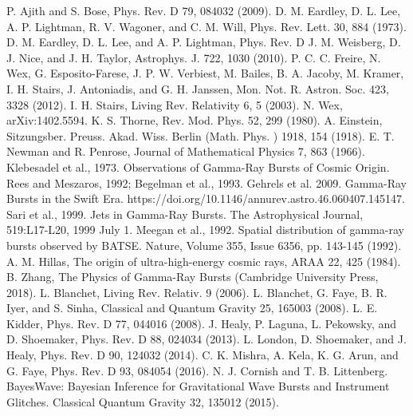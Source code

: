 \documentclass[binding=0.6cm, LaM]{sapthesis}
\begin{document}
\begin{thebibliography}{500}
 	 P. Ajith and S. Bose, Phys. Rev. D 79, 084032 (2009). 
 	 D. M. Eardley, D. L. Lee, A. P. Lightman, R. V. Wagoner, and C. M. Will, Phys. Rev. Lett. 30, 884 (1973). 
 	 D. M. Eardley, D. L. Lee, and A. P. Lightman, Phys. Rev. D 
 	 J. M. Weisberg, D. J. Nice, and J. H. Taylor, Astrophys. J. 722, 1030 (2010).
 	 P. C. C. Freire, N. Wex, G. Esposito-Farese, J. P. W. Verbiest, M. Bailes, B. A. Jacoby, M. Kramer, I. H. Stairs, J. Antoniadis, and G. H. Janssen, Mon. Not. R. Astron. Soc. 423, 3328 (2012).
 	 I. H. Stairs, Living Rev. Relativity 6, 5 (2003).
 	 N. Wex, arXiv:1402.5594.
	 K. S. Thorne, Rev. Mod. Phys. 52, 299 (1980).
         A. Einstein, Sitzungsber. Preuss. Akad. Wiss. Berlin (Math. Phys. ) 1918, 154 (1918).
         E. T. Newman and R. Penrose, Journal of Mathematical Physics 7, 863 (1966).
	 Klebesadel et al., 1973. Observations of Gamma-Ray Bursts of Cosmic Origin.
	 Rees and Meszaros, 1992; Begelman et al., 1993.
	 Gehrels et al. 2009. Gamma-Ray Bursts in the Swift Era. https://doi.org/10.1146/annurev.astro.46.060407.145147.
	 Sari et al., 1999. Jets in Gamma-Ray Bursts. The Astrophysical Journal, 519:L17-L20, 1999 July 1.
	 Meegan et al., 1992. Spatial distribution of gamma-ray bursts observed by BATSE. Nature, Volume 355, Issue 6356, pp. 143-145 (1992).
	 A. M. Hillas, The origin of ultra-high-energy cosmic rays, ARAA 22, 425 (1984).
	 B. Zhang, The Physics of Gamma-Ray Bursts (Cambridge University Press, 2018).
	 L. Blanchet, Living Rev. Relativ. 9 (2006). 
	 L. Blanchet, G. Faye, B. R. Iyer, and S. Sinha, Classical and Quantum Gravity 25, 165003 (2008). 
	 L. E. Kidder, Phys. Rev. D 77, 044016 (2008). 
	 J. Healy, P. Laguna, L. Pekowsky, and D. Shoemaker, Phys. Rev. D 88, 024034 (2013). 
	 L. London, D. Shoemaker, and J. Healy, Phys. Rev. D 90, 124032 (2014). 
	 C. K. Mishra, A. Kela, K. G. Arun, and G. Faye, Phys. Rev. D 93, 084054 (2016).
	 N. J. Cornish and T. B. Littenberg. BayesWave: Bayesian Inference for Gravitational Wave Bursts and Instrument Glitches. Classical Quantum Gravity 32, 135012 (2015). 
\end{thebibliography}

\printbibliography
\end{document}
